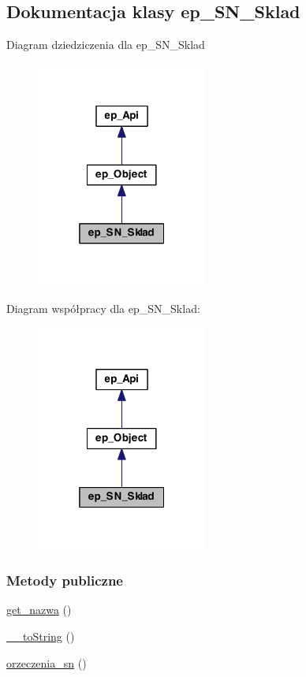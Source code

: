 \hypertarget{classep___s_n___sklad}{\subsection{Dokumentacja klasy ep\-\_\-\-S\-N\-\_\-\-Sklad}
\label{classep___s_n___sklad}
}


Diagram dziedziczenia dla ep\-\_\-\-S\-N\-\_\-\-Sklad\nopagebreak
\begin{figure}[H]
\begin{center}
\leavevmode
\includegraphics[width=160pt]{classep___s_n___sklad__inherit__graph}
\end{center}
\end{figure}


Diagram współpracy dla ep\-\_\-\-S\-N\-\_\-\-Sklad\-:\nopagebreak
\begin{figure}[H]
\begin{center}
\leavevmode
\includegraphics[width=160pt]{classep___s_n___sklad__coll__graph}
\end{center}
\end{figure}
\subsubsection*{Metody publiczne}
\begin{DoxyCompactItemize}
\item 
\hyperlink{classep___s_n___sklad_ac0818f0049d7b84f08f77128f54cee36}{get\-\_\-nazwa} ()
\item 
\hyperlink{classep___s_n___sklad_a7516ca30af0db3cdbf9a7739b48ce91d}{\-\_\-\-\_\-to\-String} ()
\item 
\hyperlink{classep___s_n___sklad_a1da449088f8d852fb2a7a425e8036b13}{orzeczenia\-\_\-sn} ()
\end{DoxyCompactItemize}
